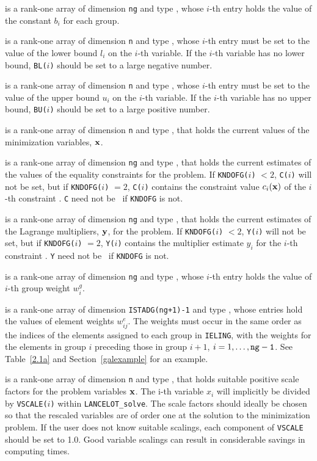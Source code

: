 \documentclass{galahad}
\newcommand{\fullpackagename}{LANC\-E\-LOT}
\newcommand{\solver}{{\tt \fullpackagename\_solve}}
\begin{document}
\begin{description}
 is a rank-one array of dimension {\tt ng} and type
\realdp, whose $i$-th entry holds the value of the constant
$b_i$ for each group.

 is a rank-one array of dimension {\tt n} and type
\realdp, whose $i$-th entry must be set
to the value of the lower bound $l_i$ on the $i$-th variable.
If the $i$-th variable has no lower bound, {\tt BL($i$)} should be set to
a large negative number.

 is a rank-one array of dimension {\tt n} and type
\realdp, whose $i$-th
entry must be set
to the value of the upper bound $u_i$ on the $i$-th variable.
If the $i$-th variable has no upper bound, {\tt BU($i$)} should be set to
a large positive number.

 is a rank-one array of dimension {\tt n} and type
\realdp, that holds the current values of the
minimization variables, ${\mathbf{x}}$.

 is a rank-one array of dimension {\tt ng} and type
\realdp, that holds the current estimates of the values of the
equality constraints
for the problem.
If {\tt KNDOFG($i$)} $<2$, {\tt C($i$)}
will not be set, but if {\tt KNDOFG($i$)} $= 2$, {\tt C($i$)} contains
the constraint value $c_i({\mathbf{x}})$
of the $i$-th constraint .
{\tt C} need not be \associated\ if {\tt KNDOFG} is not.

 is a rank-one array of dimension {\tt ng} and type
\realdp, that holds the current estimates of the Lagrange multipliers,
${\mathbf{y}}$, for the problem. If {\tt KNDOFG($i$)} $<2$, {\tt Y($i$)}
will not be set, but if {\tt KNDOFG($i$)} $= 2$, {\tt Y($i$)} contains
the multiplier estimate $y_i$
for the $i$-th constraint .
{\tt Y} need not be \associated\ if {\tt KNDOFG} is not.

 is a rank-one array of dimension {\tt ng} and type
\realdp, whose $i$-th entry holds
the value of $i$-th group weight $w^g_i$.

 is a rank-one array of dimension {\tt ISTADG(ng+1)-1} and type
\realdp, whose entries hold the values of element weights
$w^e_{ij}$. The weights must occur in the same order as the indices of the
elements assigned to each group
in {\tt IELING}, with the weights for the elements
in group $i$ preceding those in group $i+1$, $i=1, \ldots, {\tt ng-1}$.
See Table~\ref{2.1a} and Section~\ref{galexample} for an example.

 is a rank-one array of dimension {\tt n} and type
\realdp, that holds suitable positive scale
factors for the problem variables ${\mathbf{x}}$.
The {i}-th variable $x_i$ will implicitly be divided by
{\tt VSCALE($i$)} within \solver. The scale factors should ideally
be chosen so that the rescaled variables are of order one at the
solution to the minimization problem. If the user does not know
suitable scalings, each component of {\tt VSCALE} should be set to 1.0.
Good variable scalings can result in considerable savings in
computing times.


\end{description}
\end{document}
